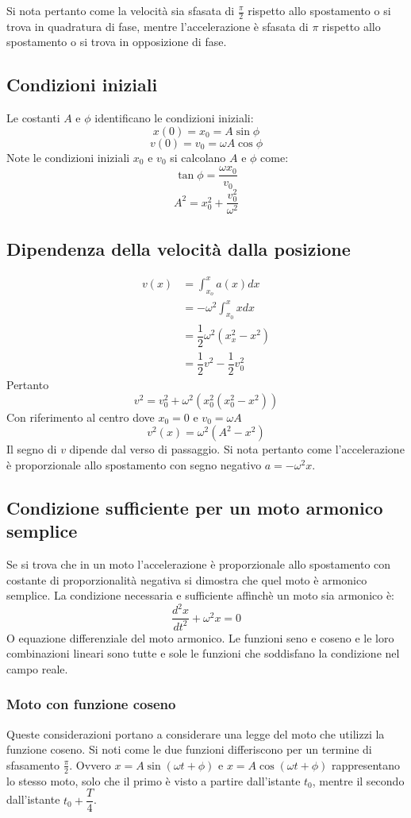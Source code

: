 \documentclass[class=book, crop=false, oneside, 12pt]{standalone}
\begin{document}
	Si nota pertanto come la velocit\`a sia sfasata di $\frac{\pi}{2}$  rispetto allo spostamento o si trova in quadratura di fase, mentre l'accelerazione \`e sfasata di $\pi$ rispetto allo spostamento o si trova in opposizione di fase.
	\subsection{Condizioni iniziali}
	Le costanti $A$ e $\phi$ identificano le condizioni iniziali:
	$$ x(0) = x_0 = A \sin\phi$$
	$$v(0) = v_0 = \omega A \cos\phi$$
	Note le condizioni iniziali $x_0$ e $v_0$ si calcolano $A$ e $\phi$ come:
	$$\tan \phi = \dfrac{\omega x_0}{v_0}$$
	$$A^2 = x_0^2 + \dfrac{v_0^2}{\omega^2}$$
	\subsection{Dipendenza della velocit\`a dalla posizione}
	\begin{align*}
		v(x) &= \int_{x_o}^x a(x)dx\\
		     &=-\omega^2\int_{x_0}^x xdx\\
		     &=\dfrac{1}{2}\omega^2(x_x^2-x^2)\\
		     &=\dfrac{1}{2}v^2 - \dfrac{1}{2}v_0^2
	\end{align*}
	Pertanto
	$$v^2 = v_0^2 + \omega^2(x_0^2(x_0^2-x^2))$$
	Con riferimento al centro dove $x_0 = 0$ e $v_0 = \omega A$
	$$v^2(x)=\omega^2(A^2 - x^2)$$
	Il segno di $v$ dipende dal verso di passaggio.
	Si nota pertanto come l'accelerazione \`e proporzionale allo spostamento con segno negativo $a =-\omega^2 x$.
	\subsection{Condizione sufficiente per un moto armonico semplice}
	Se si trova che in un moto l'accelerazione \`e proporzionale allo spostamento con costante di proporzionalit\`a negativa si dimostra che quel moto \`e armonico semplice.
	La condizione necessaria e sufficiente affinch\`e un moto sia armonico \`e:
	$$\dfrac{d^2x}{dt^2}+\omega^2x=0$$
	O equazione differenziale del moto armonico.
	Le funzioni seno e coseno e le loro combinazioni lineari sono tutte e sole le funzioni che soddisfano la condizione nel campo reale.
		\subsubsection{Moto con funzione coseno}
		Queste considerazioni portano a considerare una legge del moto che utilizzi la funzione coseno.
		Si noti come le due funzioni differiscono per un termine di sfasamento $\frac{\pi}{2}$.
		Ovvero $x=A\sin(\omega t+\phi)$ e $x = A\cos(\omega t+\phi)$ rappresentano lo stesso moto, solo che il primo \`e visto a partire dall'istante $t_0$, mentre il secondo dall'istante $t_0 + \dfrac{T}{4}$.
\end{document}
